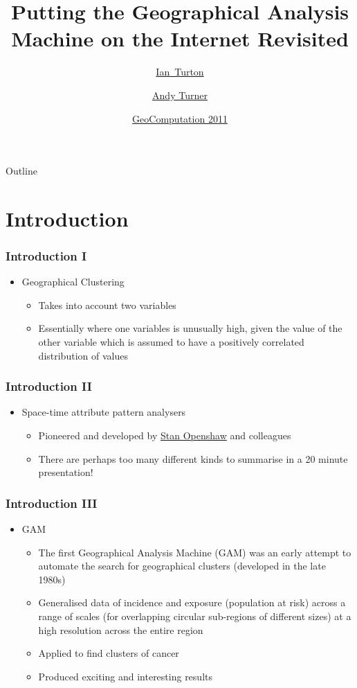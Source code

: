 \documentclass{beamer}
\title[GAM Revisited] %
{Putting the Geographical Analysis Machine on the Internet Revisited}
\author[Turton, Turner] %
{\href{http://www.ccg.leeds.ac.uk/people/i.turton/}{Ian~Turton\inst{1}} \and \href{http://www.geog.leeds.ac.uk/people/a.turner/}{Andy Turner}\inst{2}}
\institute[ ] %
{
  \inst{1}%
Independent Researcher\\
  ijturton@gmail.com
  \and
  \inst{2}%
  \href{http://www.ccg.leeds.ac.uk/}{Centre for Computational Geography}\\
  \href{http://www.leeds.ac.uk/}{University of Leeds}\\
  A.G.D.Turner@leeds.ac.uk}
\date[ ] %
{\href{http://standard.cege.ucl.ac.uk/workshops/Geocomputation/}{GeoComputation 2011}}
\begin{document}
\begin{frame}
  \titlepage
\end{frame}


\begin{frame}{Outline}
  \tableofcontents
\end{frame}


\section{Introduction}

\begin{frame}[t]
\frametitle{Introduction I}
\begin{itemize}
  \item Geographical Clustering
  \begin{itemize}
    \item Takes into account two variables 
    \item Essentially where one variables is unusually high, given the value of the other variable which is assumed to have a positively correlated distribution of values 
  \end{itemize}
\end{itemize}
\end{frame}

\begin{frame}[t]
\frametitle{Introduction II}
\begin{itemize}
  \item Space-time attribute pattern analysers
  \begin{itemize}
    \item Pioneered and developed by \href{http://www.ccg.leeds.ac.uk/people/s.openshaw/}{Stan Openshaw} and colleagues
    \item There are perhaps too many different kinds to summarise in a 20 minute presentation!
  \end{itemize}
\end{itemize}
\end{frame}

\begin{frame}[t]
\frametitle{Introduction III}
\begin{itemize}
  \item GAM
  \begin{itemize}
    \item The first Geographical Analysis Machine (GAM) was an early attempt to automate the search for geographical clusters (developed in the late 1980s)
    \item Generalised data of incidence and exposure (population at risk) across a range of scales (for overlapping circular sub-regions of different sizes) at a high resolution across the entire region
    \item Applied to find clusters of cancer
    \item Produced exciting and interesting results
  \end{itemize}
\end{itemize}
\end{frame}
\end{document}
